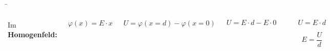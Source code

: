 \begin{frame}

	\b{
	

	
	\begin{columns}
		\vspace{-10pt}
	  	Im \textbf{Homogenfeld:}

		\begin{equation*}
			\varphi(x) = E \cdot x
		\end{equation*}

		

		\begin{equation*}
			U = \varphi(x= d) - \varphi(x= 0) 
		\end{equation*}

		\begin{equation*}
			U =  E \cdot d - E \cdot 0
		\end{equation*}
   


	\phantom{text}\\


		\begin{Merksatz}{}
			\begin{equation*}
				U = E \cdot d
			\end{equation*}

			\begin{equation*}
				E =  \frac{U}{d}
			\end{equation*}


		\end{Merksatz}
		





		\begin{figure}[h!]
			\centering
			
		\end{figure}

		\begin{figure}[h!]
			\centering
			


\end{figure}
\end{columns}}
\end{frame}
